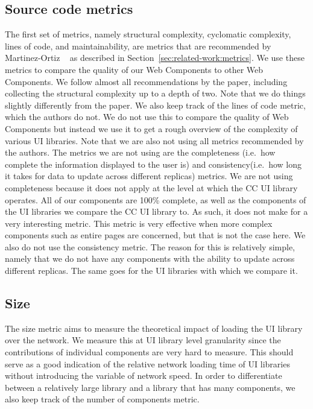 \subsection{Source code metrics}
The first set of metrics, namely structural complexity, cyclomatic complexity, lines of code, and maintainability, are metrics that are recommended by Martinez-Ortiz \etal{}~\cite{martinez-ortiz2016quality} as described in Section~\ref{sec:related-work:metrics}. We use these metrics to compare the quality of our Web Components to other Web Components. We follow almost all recommendations by the paper, including collecting the structural complexity up to a depth of two. Note that we do things slightly differently from the paper. We also keep track of the lines of code metric, which the authors do not. We do not use this to compare the quality of Web Components but instead we use it to get a rough overview of the complexity of various UI libraries. Note that we are also not using all metrics recommended by the authors. The metrics we are not using are the completeness (i.e.~how complete the information displayed to the user is) and consistency(i.e.~how long it takes for data to update across different replicas) metrics. We are not using completeness because it does not apply at the level at which the CC UI library operates. All of our components are 100\% complete, as well as the components of the UI libraries we compare the CC UI library to. As such, it does not make for a very interesting metric. This metric is very effective when more complex components such as entire pages are concerned, but that is not the case here. We also do not use the consistency metric. The reason for this is relatively simple, namely that we do not have any components with the ability to update across different replicas. The same goes for the UI libraries with which we compare it.

\subsection{Size}
The size metric aims to measure the theoretical impact of loading the UI library over the network. We measure this at UI library level granularity since the contributions of individual components are very hard to measure. This should serve as a good indication of the relative network loading time of UI libraries without introducing the variable of network speed. In order to differentiate between a relatively large library and a library that has many components, we also keep track of the number of components metric.


